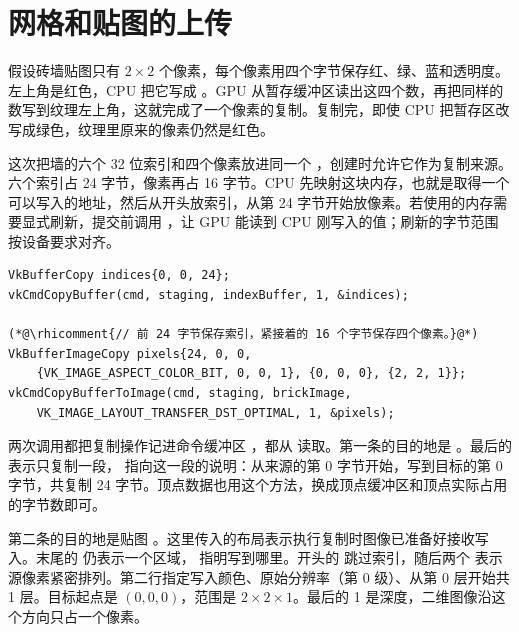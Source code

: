 \clearpage
\section{网格和贴图的上传}\label{sec:upload-api}
假设砖墙贴图只有 $2\times2$ 个像素，每个像素用四个字节保存红、绿、蓝和透明度。左上角是红色，CPU 把它写成 。GPU 从暂存缓冲区读出这四个数，再把同样的数写到纹理左上角，这就完成了一个像素的复制。复制完，即使 CPU 把暂存区改写成绿色，纹理里原来的像素仍然是红色。

这次把墙的六个 32 位索引和四个像素放进同一个 ，创建时允许它作为复制来源。六个索引占 24 字节，像素再占 16 字节。CPU 先映射这块内存，也就是取得一个可以写入的地址，然后从开头放索引，从第 24 字节开始放像素。若使用的内存需要显式刷新，提交前调用 ，让 GPU 能读到 CPU 刚写入的值；刷新的字节范围按设备要求对齐。

\begin{lstlisting}
VkBufferCopy indices{0, 0, 24};
vkCmdCopyBuffer(cmd, staging, indexBuffer, 1, &indices);

(*@\rhicomment{// 前 24 字节保存索引，紧接着的 16 个字节保存四个像素。}@*)
VkBufferImageCopy pixels{24, 0, 0,
    {VK_IMAGE_ASPECT_COLOR_BIT, 0, 0, 1}, {0, 0, 0}, {2, 2, 1}};
vkCmdCopyBufferToImage(cmd, staging, brickImage,
    VK_IMAGE_LAYOUT_TRANSFER_DST_OPTIMAL, 1, &pixels);
\end{lstlisting}

两次调用都把复制操作记进命令缓冲区 ，都从  读取。第一条的目的地是 。最后的  表示只复制一段， 指向这一段的说明：从来源的第 0 字节开始，写到目标的第 0 字节，共复制 24 字节。顶点数据也用这个方法，换成顶点缓冲区和顶点实际占用的字节数即可。

第二条的目的地是贴图 。这里传入的布局表示执行复制时图像已准备好接收写入。末尾的  仍表示一个区域， 指明写到哪里。开头的  跳过索引，随后两个  表示源像素紧密排列。第二行指定写入颜色、原始分辨率（第 0 级）、从第 0 层开始共 1 层。目标起点是 $(0,0,0)$，范围是 $2\times2\times1$。最后的 1 是深度，二维图像沿这个方向只占一个像素。

